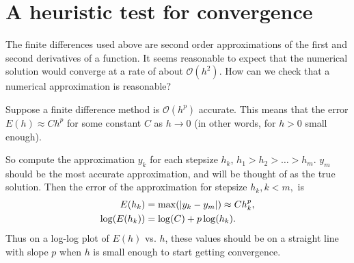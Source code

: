 \section*{A heuristic test for convergence}
The finite differences used above are second order approximations of the first and second derivatives of a function.  It seems reasonable to expect that the numerical solution would converge at a rate of about $\mathcal{O}(h^2)$. How can we check that a numerical approximation is reasonable?

Suppose a finite difference method is $\mathcal{O}(h^p)$ accurate.
This means that the error $E(h) \approx Ch^p$ for some constant $C$ as $h \to 0$ (in other words, for $h>0$ small enough).
 
So compute the approximation $y_k$ for each stepsize $h_k$, $h_1 > h_2> \ldots>h_m$.
$y_m$ should be the most accurate approximation, and will be thought of as the true solution. 
Then the error of the approximation for 
stepsize $h_k, k < m,$ is 
\begin{align*}
	E(h_k) &= \max( \left\lvert y_k - y_m\right\rvert) \approx C h_k^p ,\\
	\log(E(h_k)) &= \log(C) + p \log(h_k).
\end{align*}
Thus on a log-log plot of $E(h)$ vs. $h$, these values should be on a straight line with slope $p$ when $h$ is small enough to start getting convergence. 

